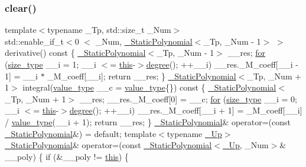 \subsubsection{\texorpdfstring{clear()}{clear()}}
{\footnotesize\ttfamily template$<$typename \+\_\+\+Tp, std\+::size\+\_\+t \+\_\+\+Num$>$ \\
std\+::enable\+\_\+if\+\_\+t$<$0 $<$ \+\_\+\+Num, \hyperlink{class____gnu__cxx_1_1__StaticPolynomial}{\+\_\+\+Static\+Polynomial}$<$\+\_\+\+Tp, \+\_\+\+Num -\/ 1$>$ $>$ derivative() const \{ \hyperlink{class____gnu__cxx_1_1__StaticPolynomial}{\+\_\+\+Static\+Polynomial}$<$\+\_\+\+Tp, \+\_\+\+Num -\/ 1$>$ \+\_\+\+\_\+res; \hyperlink{class____gnu__cxx_1_1__StaticPolynomial_a93fc2113c7886a70c56ef43161e83421}{for} (\hyperlink{class____gnu__cxx_1_1__StaticPolynomial_a3384ce6a956ad398fc995e6ee53b2b18}{size\+\_\+type} \+\_\+\+\_\+i = 1; \+\_\+\+\_\+i $<$= \hyperlink{class____gnu__cxx_1_1__StaticPolynomial_a4de3c06513ac6f8677fe098213a89fff}{this}-\/$>$\hyperlink{class____gnu__cxx_1_1__StaticPolynomial_a56b1719601ce049e6dd768e10edfd171}{degree}(); ++\+\_\+\+\_\+i) \+\_\+\+\_\+res.\+\_\+\+M\+\_\+coeff\mbox{[}\+\_\+\+\_\+i -\/ 1\mbox{]} = \+\_\+\+\_\+i $\ast$ \+\_\+\+M\+\_\+coeff\mbox{[}\+\_\+\+\_\+i\mbox{]}; return \+\_\+\+\_\+res; \} \hyperlink{class____gnu__cxx_1_1__StaticPolynomial}{\+\_\+\+Static\+Polynomial}$<$\+\_\+\+Tp, \+\_\+\+Num + 1$>$ integral(\hyperlink{class____gnu__cxx_1_1__StaticPolynomial_af23110f5a002cd6caa3542df7cf35284}{value\+\_\+type} \+\_\+\+\_\+c = \hyperlink{class____gnu__cxx_1_1__StaticPolynomial_af23110f5a002cd6caa3542df7cf35284}{value\+\_\+type}\{\}) const \{ \hyperlink{class____gnu__cxx_1_1__StaticPolynomial}{\+\_\+\+Static\+Polynomial}$<$\+\_\+\+Tp, \+\_\+\+Num + 1$>$ \+\_\+\+\_\+res; \+\_\+\+\_\+res.\+\_\+\+M\+\_\+coeff\mbox{[}0\mbox{]} = \+\_\+\+\_\+c; \hyperlink{class____gnu__cxx_1_1__StaticPolynomial_a93fc2113c7886a70c56ef43161e83421}{for} (\hyperlink{class____gnu__cxx_1_1__StaticPolynomial_a3384ce6a956ad398fc995e6ee53b2b18}{size\+\_\+type} \+\_\+\+\_\+i = 0; \+\_\+\+\_\+i $<$= \hyperlink{class____gnu__cxx_1_1__StaticPolynomial_a4de3c06513ac6f8677fe098213a89fff}{this}-\/$>$\hyperlink{class____gnu__cxx_1_1__StaticPolynomial_a56b1719601ce049e6dd768e10edfd171}{degree}(); ++\+\_\+\+\_\+i) \+\_\+\+\_\+res.\+\_\+\+M\+\_\+coeff\mbox{[}\+\_\+\+\_\+i + 1\mbox{]} = \+\_\+\+M\+\_\+coeff\mbox{[}\+\_\+\+\_\+i\mbox{]} / \hyperlink{class____gnu__cxx_1_1__StaticPolynomial_af23110f5a002cd6caa3542df7cf35284}{value\+\_\+type}(\+\_\+\+\_\+i + 1); return \+\_\+\+\_\+res; \} \hyperlink{class____gnu__cxx_1_1__StaticPolynomial}{\+\_\+\+Static\+Polynomial}\& operator=(const \hyperlink{class____gnu__cxx_1_1__StaticPolynomial}{\+\_\+\+Static\+Polynomial}\&) = default; template$<$typename \hyperlink{namespace____gnu__cxx_ab693ea357b6429b331e0bf09f9442385}{\+\_\+\+Up}$>$ \hyperlink{class____gnu__cxx_1_1__StaticPolynomial}{\+\_\+\+Static\+Polynomial}\& operator=(const \hyperlink{class____gnu__cxx_1_1__StaticPolynomial}{\+\_\+\+Static\+Polynomial}$<$\hyperlink{namespace____gnu__cxx_ab693ea357b6429b331e0bf09f9442385}{\+\_\+\+Up}, \+\_\+\+Num$>$\& \+\_\+\+\_\+poly) \{ if (\&\+\_\+\+\_\+poly != \hyperlink{class____gnu__cxx_1_1__StaticPolynomial_a4de3c06513ac6f8677fe098213a89fff}{this}) \{ }
